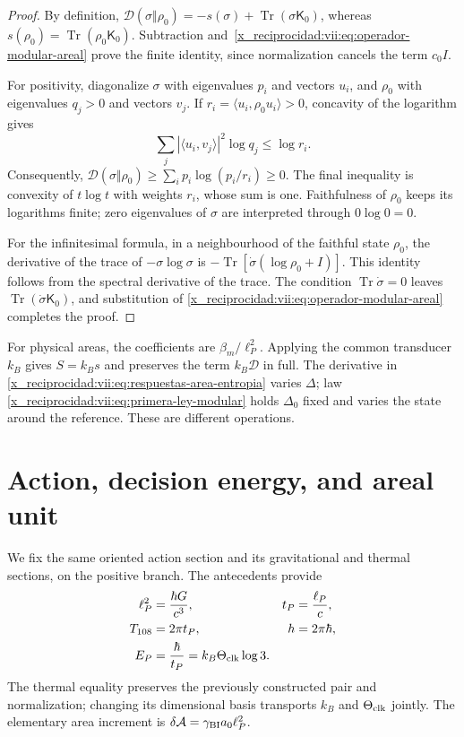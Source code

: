 \begin{proof}
By definition,
\(\mathcal D(\sigma\Vert\rho_0)=-s(\sigma)
+\operatorname{Tr}(\sigma\mathsf K_0)\), whereas
\(s(\rho_0)=\operatorname{Tr}(\rho_0\mathsf K_0)\).
Subtraction and~\eqref{x_reciprocidad:vii:eq:operador-modular-areal} prove the finite
identity, since normalization cancels the term \(c_0I\).

For positivity, diagonalize \(\sigma\) with eigenvalues
\(p_i\) and vectors \(u_i\), and \(\rho_0\) with eigenvalues
\(q_j>0\) and vectors \(v_j\). If
\(r_i=\langle u_i,\rho_0u_i\rangle>0\), concavity of the
logarithm gives
\[
 \sum_j|\langle u_i,v_j\rangle|^2\log q_j\le\log r_i.
\]
Consequently,
\(\mathcal D(\sigma\Vert\rho_0)
\ge\sum_i p_i\log(p_i/r_i)\ge0\).
The final inequality is convexity of \(t\log t\) with weights
\(r_i\), whose sum is one. Faithfulness of \(\rho_0\) keeps its
logarithms finite; zero eigenvalues of \(\sigma\) are
interpreted through \(0\log0=0\).

For the infinitesimal formula, in a neighbourhood of the faithful state \(\rho_0\),
the derivative of the trace of \(-\sigma\log\sigma\) is
\(-\operatorname{Tr}[\dot\sigma(\log\rho_0+I)]\).
This identity follows from the spectral derivative of the trace.
The condition \(\operatorname{Tr}\dot\sigma=0\) leaves
\(\operatorname{Tr}(\dot\sigma\mathsf K_0)\), and substitution of
\eqref{x_reciprocidad:vii:eq:operador-modular-areal} completes the proof.
\end{proof}

For physical areas, the coefficients are \(\beta_m/\ell_P^2\).
Applying the common transducer \(k_B\) gives \(S=k_Bs\) and
preserves the term \(k_B\mathcal D\) in full. The derivative in
\eqref{x_reciprocidad:vii:eq:respuestas-area-entropia} varies \(\Delta\); law
\eqref{x_reciprocidad:vii:eq:primera-ley-modular} holds \(\Delta_0\) fixed and
varies the state around the reference. These are different operations.

\section{Action, decision energy, and areal unit}
\label{x_reciprocidad:vii:subsec:conversion-informacion-area}

We fix the same oriented action section and its gravitational
and thermal sections, on the positive branch. The antecedents provide
\begin{equation}
 \begin{aligned}
 \ell_P^2&=\frac{\hbar G}{c^3},& t_P&=\frac{\ell_P}{c},\\
 T_{108}&=2\pi t_P,& h&=2\pi\hbar,\\
 E_P&=\frac{\hbar}{t_P}=k_B\Theta_{\rm clk}\log3.&&
 \end{aligned}
 \label{x_reciprocidad:vii:eq:unidad-accion-informacion}
\end{equation}
The thermal equality preserves the previously constructed pair and
normalization; changing its dimensional basis transports
\(k_B\) and \(\Theta_{\rm clk}\) jointly. The elementary area increment is
\(\delta\mathcal A=\gamma_{\rm BI}a_0\ell_P^2\).


